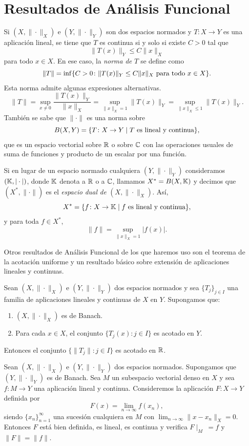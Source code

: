 \documentclass[a4paper, 12pt, oneside]{book}
\begin{document}
\section{Resultados de Análisis Funcional}

Si $(X,\|\cdot\|_X)$ e $(Y,\|\cdot\|_Y)$ son dos espacios normados y $T \colon X \to Y$ es una aplicación lineal, se tiene que $T$ es continua si y solo si existe $C > 0$ tal que
\[\|T(x)\|_Y \leq C\|x\|_X\]
para todo $x \in X$. En ese caso, la \emph{norma de $T$} se define como
\[\|T\| = \inf\{C > 0 \colon \|T(x)\|_Y \leq C\|x\|_X \textup{ para todo } x \in X\}.\]
Esta norma admite algunas expresiones alternativas.
\[\|T\| = \sup_{x \neq 0} \frac{\|T(x)\|_Y}{\|x\|_X} = \sup_{\|x\|_X = 1} \|T(x)\|_Y = \sup_{\|x\|_X \leq 1} \|T(x)\|_Y.\]
También se sabe que $\|\cdot\|$ es una norma sobre
\[B(X,Y) = \{T \colon X \to Y \mid T \textup{ es lineal y continua}\},\]
que es un espacio vectorial sobre $\mathbb R$ o sobre $\mathbb C$ con las operaciones usuales de suma de funciones y producto de un escalar por una función.

Si en lugar de un espacio normado cualquiera $(Y,\|\cdot\|_Y)$ consideramos $(\mathbb K,|\cdot|)$, donde $\mathbb K$ denota a $\mathbb R$ o a $\mathbb C$, llamamos $X^* = B(X,\mathbb K)$ y decimos que $(X^*,\|\cdot\|)$ es el \emph{espacio dual de $(X,\|\cdot\|_X)$}. Así,
\[X^* = \{f \colon X \to \mathbb K \mid f \textup{ es lineal y continua}\},\]
y para toda $f \in X^*$,
\[\|f\| = \sup_{\|x\|_X=1}|f(x)|.\]

Otros resultados de Análisis Funcional de los que haremos uso son el teorema de la acotación uniforme y un resultado básico sobre extensión de aplicaciones lineales y continuas.

\begin{theorem}\label{1.2.2}
    Sean $(X, \|\cdot\|_X)$ e $(Y,\|\cdot\|_Y)$ dos espacios normados y sea $\{T_j\}_{j \in I}$ una familia de aplicaciones lineales y continuas de $X$ en $Y$. Supongamos que:
    \begin{enumerate}
        \item $(X,\|\cdot\|_X)$ es de Banach.
        \item Para cada $x \in X$, el conjunto $\{T_j(x) \colon j \in I\}$ es acotado en $Y$.
    \end{enumerate}
    Entonces el conjunto $\{\|T_j\| \colon j \in I\}$ es acotado en $\mathbb R$.
\end{theorem}

\begin{theorem}\label{1.3.3}
    Sean $(X,\|\cdot\|_X)$ e $(Y,\|\cdot\|_Y)$ dos espacios normados. Supongamos que $(Y,\|\cdot\|_Y)$ es de Banach. Sea $M$ un subespacio vectorial denso en $X$ y sea $f \colon M \to Y$ una aplicación lineal y continua. Consideremos la aplicación $F \colon X \to Y$ definida por 
    \[F(x) = \lim_{n\to\infty} f(x_n),\]
    siendo $\{x_n\}_{n=1}^\infty$ una sucesión cualquiera en $M$ con $\lim_{n\to\infty} \|x-x_n\|_X = 0$. Entonces $F$ está bien definida, es lineal, es continua y verifica $F\! \mid_M \ = f$ y $\|F\| = \|f\|$.
\end{theorem}
\end{document}
